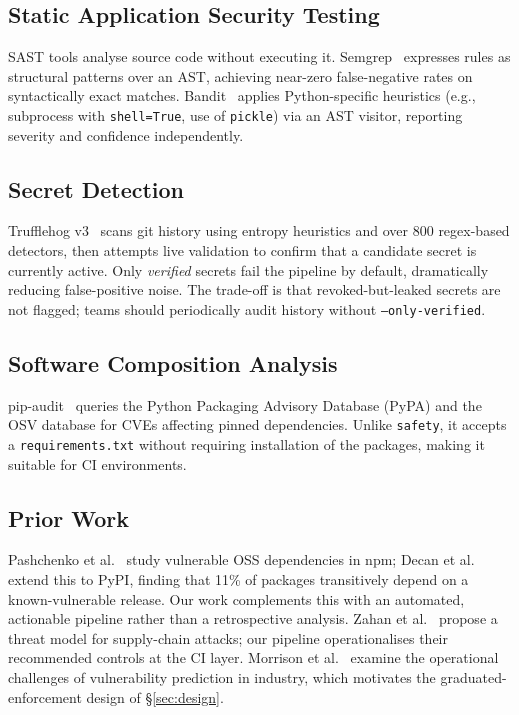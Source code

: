 \documentclass[conference]{IEEEtran}
\begin{document}
\subsection{Static Application Security Testing}

SAST tools analyse source code without executing it. Semgrep~\cite{semgrep}
expresses rules as structural patterns over an AST, achieving near-zero
false-negative rates on syntactically exact matches. Bandit~\cite{bandit}
applies Python-specific heuristics (e.g., subprocess with \texttt{shell=True},
use of \texttt{pickle}) via an AST visitor, reporting severity and confidence
independently.

\subsection{Secret Detection}

Trufflehog v3~\cite{trufflehog} scans git history using entropy heuristics and
over 800 regex-based detectors, then attempts live validation to confirm that
a candidate secret is currently active. Only \emph{verified} secrets fail the
pipeline by default, dramatically reducing false-positive noise. The trade-off
is that revoked-but-leaked secrets are not flagged; teams should periodically
audit history without \texttt{--only-verified}.

\subsection{Software Composition Analysis}

pip-audit~\cite{pipaudit} queries the Python Packaging Advisory Database
(PyPA) and the OSV database for CVEs affecting pinned dependencies. Unlike
\texttt{safety}, it accepts a \texttt{requirements.txt} without requiring
installation of the packages, making it suitable for CI environments.

\subsection{Prior Work}

Pashchenko et al.~\cite{pashchenko2018} study vulnerable OSS dependencies in
npm; Decan et al.~\cite{decan2018} extend this to PyPI, finding that 11\% of
packages transitively depend on a known-vulnerable release. Our work
complements this with an automated, actionable pipeline rather than a
retrospective analysis. Zahan et al.~\cite{zahan2022} propose a threat
model for supply-chain attacks; our pipeline operationalises their
recommended controls at the CI layer. Morrison et al.~\cite{morrison2018}
examine the operational challenges of vulnerability prediction in industry,
which motivates the graduated-enforcement design of \S\ref{sec:design}.
\end{document}
